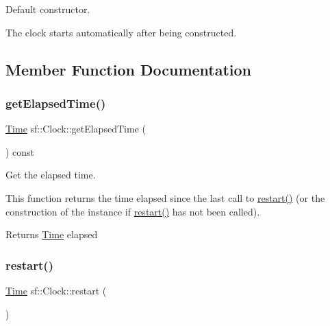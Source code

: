 Default constructor. 

The clock starts automatically after being constructed. \begin{DoxyVerb}\end{DoxyVerb}
 

\subsection{Member Function Documentation}
\mbox{\label{classsf_1_1_clock_abe889b42a65bcd8eefc16419645d08a7}} 
\subsubsection{\texorpdfstring{getElapsedTime()}{getElapsedTime()}}
{\footnotesize\ttfamily \mbox{\hyperlink{classsf_1_1_time}{Time}} sf\+::\+Clock\+::get\+Elapsed\+Time (\begin{DoxyParamCaption}{ }\end{DoxyParamCaption}) const}



Get the elapsed time. 

This function returns the time elapsed since the last call to \mbox{\hyperlink{classsf_1_1_clock_a123e2627f2943e5ecaa1db0c7df3231b}{restart()}} (or the construction of the instance if \mbox{\hyperlink{classsf_1_1_clock_a123e2627f2943e5ecaa1db0c7df3231b}{restart()}} has not been called).

\begin{DoxyReturn}{Returns}
\mbox{\hyperlink{classsf_1_1_time}{Time}} elapsed \begin{DoxyVerb}\end{DoxyVerb}
 
\end{DoxyReturn}
\mbox{\label{classsf_1_1_clock_a123e2627f2943e5ecaa1db0c7df3231b}} 
\subsubsection{\texorpdfstring{restart()}{restart()}}
{\footnotesize\ttfamily \mbox{\hyperlink{classsf_1_1_time}{Time}} sf\+::\+Clock\+::restart (\begin{DoxyParamCaption}{ }\end{DoxyParamCaption})}



